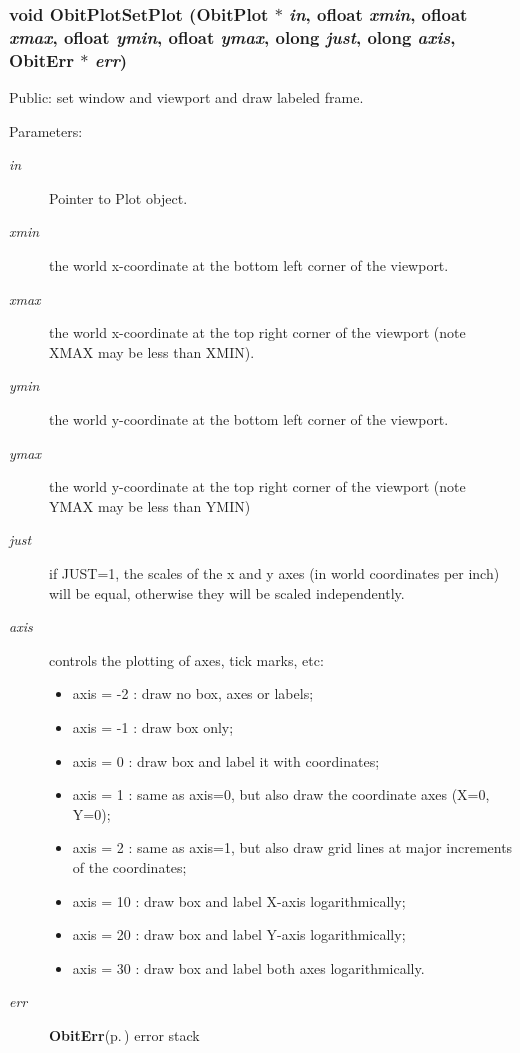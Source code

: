 \subsubsection{\setlength{\rightskip}{0pt plus 5cm}void Obit\-Plot\-Set\-Plot ({\bf Obit\-Plot} $\ast$ {\em in}, {\bf ofloat} {\em xmin}, {\bf ofloat} {\em xmax}, {\bf ofloat} {\em ymin}, {\bf ofloat} {\em ymax}, {\bf olong} {\em just}, {\bf olong} {\em axis}, {\bf Obit\-Err} $\ast$ {\em err})}\label{ObitPlot_8h_a15}


Public: set window and viewport and draw labeled frame. 

\begin{Desc}
\item[Parameters:]
\begin{description}
\item[{\em in}]Pointer to Plot object. \item[{\em xmin}]the world x-coordinate at the bottom left corner of the viewport. \item[{\em xmax}]the world x-coordinate at the top right corner of the viewport (note XMAX may be less than XMIN). \item[{\em ymin}]the world y-coordinate at the bottom left corner of the viewport. \item[{\em ymax}]the world y-coordinate at the top right corner of the viewport (note YMAX may be less than YMIN) \item[{\em just}]if JUST=1, the scales of the x and y axes (in world coordinates per inch) will be equal, otherwise they will be scaled independently. \item[{\em axis}]controls the plotting of axes, tick marks, etc: \begin{itemize}
\item axis = -2 : draw no box, axes or labels; \item axis = -1 : draw box only; \item axis = 0 : draw box and label it with coordinates; \item axis = 1 : same as axis=0, but also draw the coordinate axes (X=0, Y=0); \item axis = 2 : same as axis=1, but also draw grid lines at major increments of the coordinates; \item axis = 10 : draw box and label X-axis logarithmically; \item axis = 20 : draw box and label Y-axis logarithmically; \item axis = 30 : draw box and label both axes logarithmically. \end{itemize}
\item[{\em err}]{\bf Obit\-Err}{\rm (p.\,\pageref{structObitErr})} error stack \end{description}
\end{Desc}

